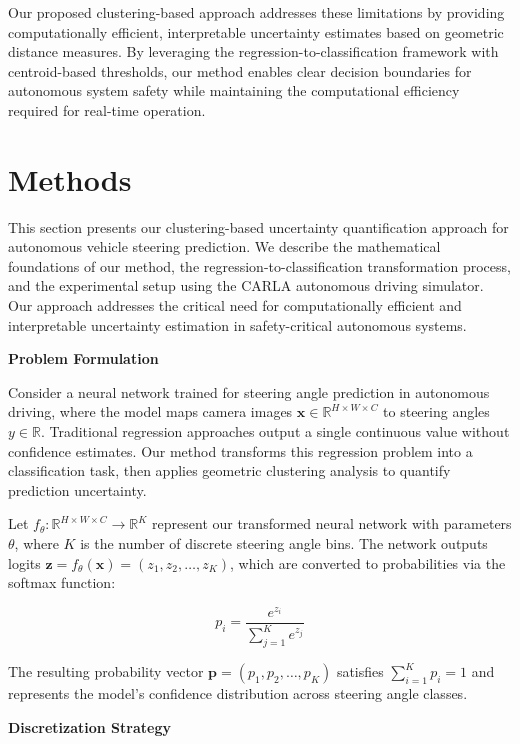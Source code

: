 Our proposed clustering-based approach addresses these limitations by providing computationally efficient, interpretable uncertainty estimates based on geometric distance measures. By leveraging the regression-to-classification framework with centroid-based thresholds, our method enables clear decision boundaries for autonomous system safety while maintaining the computational efficiency required for real-time operation.


\section{Methods}

This section presents our clustering-based uncertainty quantification approach for autonomous vehicle steering prediction. We describe the mathematical foundations of our method, the regression-to-classification transformation process, and the experimental setup using the CARLA autonomous driving simulator. Our approach addresses the critical need for computationally efficient and interpretable uncertainty estimation in safety-critical autonomous systems.

\textbf{Problem Formulation}

Consider a neural network trained for steering angle prediction in autonomous driving, where the model maps camera images $\mathbf{x} \in \mathbb{R}^{H \times W \times C}$ to steering angles $y \in \mathbb{R}$. Traditional regression approaches output a single continuous value without confidence estimates. Our method transforms this regression problem into a classification task, then applies geometric clustering analysis to quantify prediction uncertainty.

Let $f_{\theta}: \mathbb{R}^{H \times W \times C} \rightarrow \mathbb{R}^K$ represent our transformed neural network with parameters $\theta$, where $K$ is the number of discrete steering angle bins. The network outputs logits $\mathbf{z} = f_{\theta}(\mathbf{x}) = (z_1, z_2, \ldots, z_K)$, which are converted to probabilities via the softmax function:

$$p_i = \frac{e^{z_i}}{\sum_{j=1}^{K} e^{z_j}}$$

The resulting probability vector $\mathbf{p} = (p_1, p_2, \ldots, p_K)$ satisfies $\sum_{i=1}^K p_i = 1$ and represents the model's confidence distribution across steering angle classes.

\textbf{Discretization Strategy}


